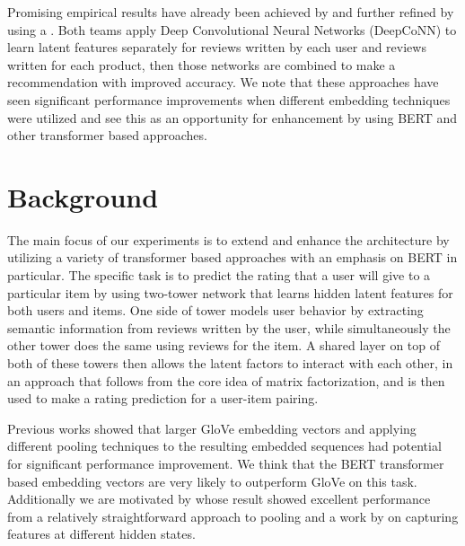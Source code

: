 \documentclass[11pt,a4paper]{article}
\begin{document}
Promising empirical results have already been achieved by \citet{zheng2017joint-modeling} and further refined by using a \citet{DeepCoNN-Movie}.  Both teams apply Deep Convolutional Neural Networks (DeepCoNN) to learn latent features separately for reviews written by each user and reviews written for each product, then those networks are combined to make a recommendation with improved accuracy.  We note that these approaches have seen significant performance improvements when different embedding techniques were utilized and see this as an opportunity for enhancement by using BERT and other transformer based approaches.


\section{Background}
The main focus of our experiments is to extend and enhance the  \citet{zheng2017joint-modeling} architecture by utilizing a variety of transformer based approaches with an emphasis on BERT in particular.  The specific task is to predict the rating that a user will give to a particular item by using two-tower network that learns hidden latent features for both users and items. One side of tower models user behavior by extracting semantic information from reviews written by the user, while simultaneously the other tower does the same using reviews for the item.  A shared layer on top of both of these towers then allows the latent factors to interact with each other, in an approach that follows from the core idea of matrix factorization, and is then used to make a rating prediction for a user-item pairing.

Previous works showed that larger GloVe embedding vectors and applying different pooling techniques to the resulting embedded sequences had potential for significant performance improvement.  We think that the BERT \citep{devlin2019bert} transformer based embedding vectors are very likely to outperform GloVe on this task. Additionally we are motivated by \citet{raghavendra-transformer-2019} whose result showed excellent performance from a relatively straightforward approach to pooling and a work by  \citet{fine-tune-bert-classification} on capturing features at different hidden states.
\end{document}
